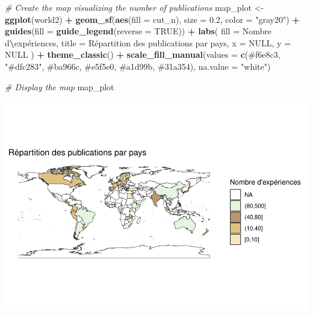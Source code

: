 \documentclass[
]{book}
\newenvironment{Shaded}{\begin{snugshade}}{\end{snugshade}}
\newcommand{\AttributeTok}[1]{\textcolor[rgb]{0.13,0.29,0.53}{#1}}
\newcommand{\CommentTok}[1]{\textcolor[rgb]{0.56,0.35,0.01}{\textit{#1}}}
\newcommand{\ConstantTok}[1]{\textcolor[rgb]{0.56,0.35,0.01}{#1}}
\newcommand{\FloatTok}[1]{\textcolor[rgb]{0.00,0.00,0.81}{#1}}
\newcommand{\FunctionTok}[1]{\textcolor[rgb]{0.13,0.29,0.53}{\textbf{#1}}}
\newcommand{\NormalTok}[1]{#1}
\newcommand{\OtherTok}[1]{\textcolor[rgb]{0.56,0.35,0.01}{#1}}
\newcommand{\SpecialCharTok}[1]{\textcolor[rgb]{0.81,0.36,0.00}{\textbf{#1}}}
\newcommand{\StringTok}[1]{\textcolor[rgb]{0.31,0.60,0.02}{#1}}
\begin{document}
\begin{Shaded}
\begin{Highlighting}[]
\CommentTok{\# Create the map visualizing the number of publications}
\NormalTok{map\_plot }\OtherTok{\textless{}{-}} \FunctionTok{ggplot}\NormalTok{(world2) }\SpecialCharTok{+}
  \FunctionTok{geom\_sf}\NormalTok{(}\FunctionTok{aes}\NormalTok{(}\AttributeTok{fill =}\NormalTok{ cut\_n), }\AttributeTok{size =} \FloatTok{0.2}\NormalTok{, }\AttributeTok{color =} \StringTok{"gray20"}\NormalTok{) }\SpecialCharTok{+}
  \FunctionTok{guides}\NormalTok{(}\AttributeTok{fill =} \FunctionTok{guide\_legend}\NormalTok{(}\AttributeTok{reverse =} \ConstantTok{TRUE}\NormalTok{)) }\SpecialCharTok{+}
  \FunctionTok{labs}\NormalTok{(}
    \AttributeTok{fill =} \StringTok{\textquotesingle{}Nombre d}\SpecialCharTok{\textbackslash{}\textquotesingle{}}\StringTok{expériences\textquotesingle{}}\NormalTok{,}
    \AttributeTok{title =} \StringTok{\textquotesingle{}Répartition des publications par pays\textquotesingle{}}\NormalTok{,}
    \AttributeTok{x =} \ConstantTok{NULL}\NormalTok{,}
    \AttributeTok{y =} \ConstantTok{NULL}
\NormalTok{  ) }\SpecialCharTok{+}
  \FunctionTok{theme\_classic}\NormalTok{() }\SpecialCharTok{+}
  \FunctionTok{scale\_fill\_manual}\NormalTok{(}\AttributeTok{values =} \FunctionTok{c}\NormalTok{(}\StringTok{\textquotesingle{}\#f6e8c3\textquotesingle{}}\NormalTok{, }\StringTok{"\#dfc283"}\NormalTok{, }\StringTok{\textquotesingle{}\#ba966c\textquotesingle{}}\NormalTok{, }\StringTok{\textquotesingle{}\#e5f5e0\textquotesingle{}}\NormalTok{, }\StringTok{\textquotesingle{}\#a1d99b\textquotesingle{}}\NormalTok{, }\StringTok{\textquotesingle{}\#31a354\textquotesingle{}}\NormalTok{), }\AttributeTok{na.value =} \StringTok{"white"}\NormalTok{)}

\CommentTok{\# Display the map}
\NormalTok{map\_plot}
\end{Highlighting}
\end{Shaded}

\includegraphics{_main_files/figure-latex/unnamed-chunk-8-1.pdf}
\end{document}
